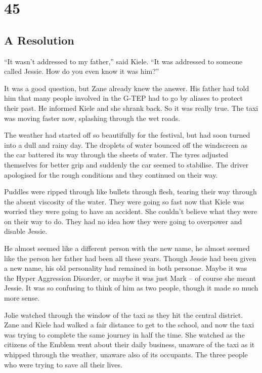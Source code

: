 \chapter{45}
\section{A Resolution}


``It wasn't addressed to my father,'' said Kiele.  ``It was addressed to someone called Jessie.  How do you even know it was him?''

It was a good question, but Zane already knew the answer.  His father had told him that many people involved in the G-TEP had to go by aliases to protect their past.  He informed Kiele and she shrank back.  So it was really true.  The taxi was moving faster now, splashing through the wet roads.  

The weather had started off so beautifully for the festival, but had soon turned into a dull and rainy day.  The droplets of water bounced off the windscreen as the car battered its way through the sheets of water.  The tyres adjusted themselves for better grip and suddenly the car seemed to stabilise.  The driver apologised for the rough conditions and they continued on their way.

Puddles were ripped through like bullets through flesh, tearing their way through the absent viscosity of the water.  They were going so fast now that Kiele was worried they were going to have an accident.  She couldn't believe what they were on their way to do.  They had no idea how they were going to overpower and disable Jessie.  

He almost seemed like a different person with the new name, he almost seemed like the person her father had been all these years.    Though Jessie had been given a new name, his old personality had remained in both personae.  Maybe it was the Hyper Aggression Disorder, or maybe it was just Mark – of course she meant Jessie.  It was so confusing to think of him as two people, though it made so much more sense.

Jolie watched through the window of the taxi as they hit the central district.  Zane and Kiele had walked a fair distance to get to the school, and now the taxi was trying to complete the same journey in half the time.  She watched as the citizens of the Emblem went about their daily business, unaware of the taxi as it whipped through the weather, unaware also of its occupants.  The three people who were trying to save all their lives.  

